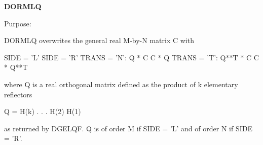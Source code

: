 {\bfseries D\+O\+R\+M\+L\+Q} 

 \begin{DoxyParagraph}{Purpose\+: }
\begin{DoxyVerb} DORMLQ overwrites the general real M-by-N matrix C with

                 SIDE = 'L'     SIDE = 'R'
 TRANS = 'N':      Q * C          C * Q
 TRANS = 'T':      Q**T * C       C * Q**T

 where Q is a real orthogonal matrix defined as the product of k
 elementary reflectors

       Q = H(k) . . . H(2) H(1)

 as returned by DGELQF. Q is of order M if SIDE = 'L' and of order N
 if SIDE = 'R'.\end{DoxyVerb}
 
\end{DoxyParagraph}

